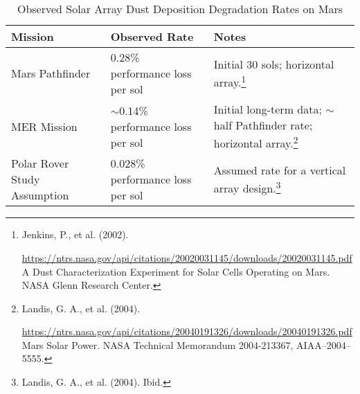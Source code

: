 \documentclass[fontsize=10pt, oneside, DIV=calc]{scrartcl}
\begin{document}
\begin{table}[htbp]
\centering
\caption{Observed Solar Array Dust Deposition Degradation Rates on Mars}
\begin{tabularx}{\textwidth}{|X|X|X|}
\hline
\textbf{Mission} & \textbf{Observed Rate} & \textbf{Notes} \\ \hline
Mars Pathfinder & 0.28\% performance loss per sol & Initial 30 sols; horizontal array.\footnote{Jenkins, P., et al. (2002). 







\href{https://ntrs.nasa.gov/api/citations/20020031145/downloads/20020031145.pdf}\url{https://ntrs.nasa.gov/api/citations/20020031145/downloads/20020031145.pdf} A Dust Characterization Experiment for Solar Cells Operating on Mars. NASA Glenn Research Center.} \\ \hline
MER Mission & $\sim$0.14\% performance loss per sol & Initial long-term data; $\sim$half Pathfinder rate; horizontal array.\footnote{Landis, G. A., et al. (2004). 







\href{https://ntrs.nasa.gov/api/citations/20040191326/downloads/20040191326.pdf}\url{https://ntrs.nasa.gov/api/citations/20040191326/downloads/20040191326.pdf} Mars Solar Power. NASA Technical Memorandum 2004-213367, AIAA–2004–5555.} \\ \hline
Polar Rover Study Assumption & 0.028\% performance loss per sol & Assumed rate for a vertical array design.\footnote{Landis, G. A., et al. (2004). Ibid.} \\ \hline
\end{tabularx}
\end{table}

\medskip
\end{document}
